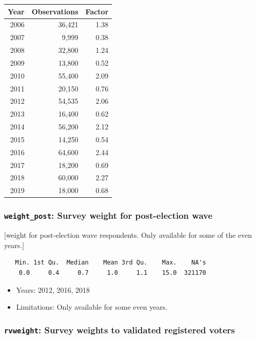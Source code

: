 \documentclass[10pt,article,oneside]{memoir}
\theoremstyle{definition}
\begin{document}
\begin{center}


\begin{tabular}{rrr}
\toprule
Year & Observations & Factor\\
\midrule
2006 & 36,421 & 1.38\\
2007 & 9,999 & 0.38\\
2008 & 32,800 & 1.24\\
2009 & 13,800 & 0.52\\
2010 & 55,400 & 2.09\\
2011 & 20,150 & 0.76\\
2012 & 54,535 & 2.06\\
2013 & 16,400 & 0.62\\
2014 & 56,200 & 2.12\\
2015 & 14,250 & 0.54\\
2016 & 64,600 & 2.44\\
2017 & 18,200 & 0.69\\
2018 & 60,000 & 2.27\\
2019 & 18,000 & 0.68\\
\bottomrule
\end{tabular}
\end{center}

\hypertarget{weight_post-survey-weight-for-post-election-wave}{%
\subsubsection{\texorpdfstring{\texttt{weight\_post}: Survey weight for
post-election
wave}{weight\_post: Survey weight for post-election wave}}\label{weight_post-survey-weight-for-post-election-wave}}

{[}weight for post-election wave respondents. Only available for some of
the even years.{]}

\begin{verbatim}
   Min. 1st Qu.  Median    Mean 3rd Qu.    Max.    NA's 
    0.0     0.4     0.7     1.0     1.1    15.0  321170 
\end{verbatim}

\begin{itemize}
\tightlist
\item
  Years: 2012, 2016, 2018
\item
  Limitations: Only available for some even years.
\end{itemize}

\hypertarget{rvweight-survey-weights-to-validated-registered-voters}{%
\subsubsection{\texorpdfstring{\texttt{rvweight}: Survey weights to
validated registered
voters}{rvweight: Survey weights to validated registered voters}}\label{rvweight-survey-weights-to-validated-registered-voters}}
\end{document}
